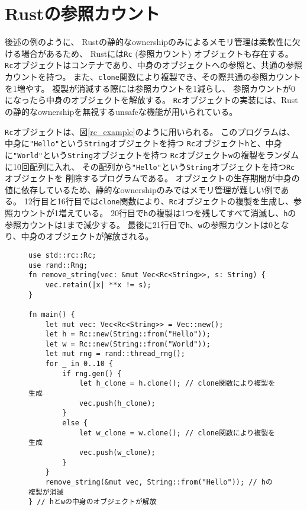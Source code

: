 \documentclass{sumiilab-paper}
\theoremstyle{mystyle}
\numberwithin{definition}{chapter} %
\begin{document}
\section{Rustの参照カウント}
後述の例のように、
Rustの静的なownershipのみによるメモリ管理は柔軟性に欠ける場合があるため、
Rustには\texttt{Rc} (参照カウント) オブジェクトも存在する。
\texttt{Rc}オブジェクトはコンテナであり、中身のオブジェクトへの参照と、共通の参照カウントを持つ。
また、\texttt{clone}関数により複製でき、その際共通の参照カウントを1増やす。
複製が消滅する際には参照カウントを1減らし、
参照カウントが0になったら中身のオブジェクトを解放する。
\texttt{Rc}オブジェクトの実装には、Rustの静的なownershipを無視するunsafeな機能が用いられている。

\texttt{Rc}オブジェクトは、図\ref{rc_example}のように用いられる。
このプログラムは、中身に\texttt{"Hello"}という\texttt{String}オブジェクトを持つ
\texttt{Rc}オブジェクト\texttt{h}と、中身に\texttt{"World"}という\texttt{String}オブジェクトを持つ
\texttt{Rc}オブジェクト\texttt{w}の複製をランダムに10回配列に入れ、
その配列から\texttt{"Hello"}という\texttt{String}オブジェクトを持つ\texttt{Rc}オブジェクトを
削除するプログラムである。
オブジェクトの生存期間が中身の値に依存しているため、静的なownershipのみではメモリ管理が難しい例である。
12行目と16行目では\texttt{clone}関数により、\texttt{Rc}オブジェクトの複製を生成し、参照カウントが1増えている。
20行目で\texttt{h}の複製は1つを残してすべて消滅し、\texttt{h}の参照カウントは1まで減少する。
最後に21行目で\texttt{h}、\texttt{w}の参照カウントは0となり、中身のオブジェクトが解放される。
\begin{figure}[htp]
\begin{lstlisting}[caption=Rcオブジェクトの利用例, label=rc_example, captionpos=b]
use std::rc::Rc;
use rand::Rng;
fn remove_string(vec: &mut Vec<Rc<String>>, s: String) {
    vec.retain(|x| **x != s);
}

fn main() {
    let mut vec: Vec<Rc<String>> = Vec::new();
    let h = Rc::new(String::from("Hello"));
    let w = Rc::new(String::from("World"));
    let mut rng = rand::thread_rng();
    for _ in 0..10 {
        if rng.gen() {
            let h_clone = h.clone(); // clone関数により複製を生成
            vec.push(h_clone);
        }
        else {
            let w_clone = w.clone(); // clone関数により複製を生成
            vec.push(w_clone);
        }
    }
    remove_string(&mut vec, String::from("Hello")); // hの複製が消滅
} // hとwの中身のオブジェクトが解放
\end{lstlisting}
\end{figure}
\end{document}
